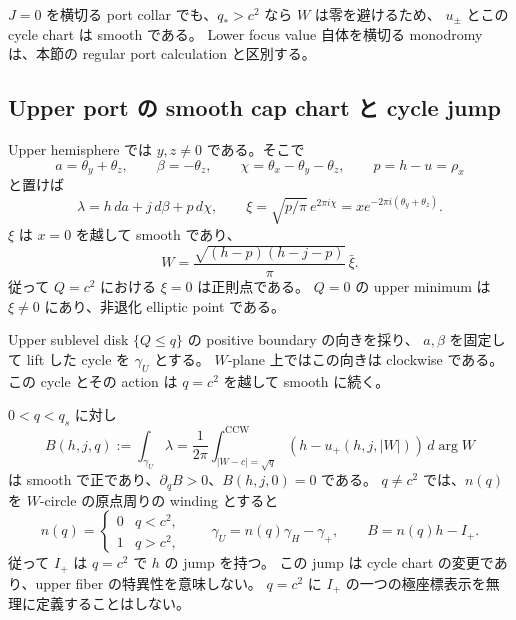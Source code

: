 $J=0$ を横切る port collar でも、$q_*>c^2$ なら $W$ は零を避けるため、
$u_\pm$ とこの cycle chart は smooth である。
Lower focus value 自体を横切る monodromy は、本節の regular port calculation と区別する。

\subsection{Upper port の smooth cap chart と cycle jump}

Upper hemisphere では $y,z\ne0$ である。そこで
\[
 a=\theta_y+\theta_z,\qquad \beta=-\theta_z,\qquad
 \chi=\theta_x-\theta_y-\theta_z,\qquad p=h-u=\rho_x
\]
と置けば
\begin{equation}\label{pa:upper-chart}
 \lambda=h\,da+j\,d\beta+p\,d\chi,
 \qquad \xi=\sqrt{p/\pi}\,e^{2\pi i\chi}
        =x e^{-2\pi i(\theta_y+\theta_z)}.
\end{equation}
$\xi$ は $x=0$ を越して smooth であり、
\[
 W=\frac{\sqrt{(h-p)(h-j-p)}}{\pi}\,\bar\xi.
\]
従って $Q=c^2$ における $\xi=0$ は正則点である。
$Q=0$ の upper minimum は $\xi\ne0$ にあり、非退化 elliptic point である。

Upper sublevel disk $\{Q\le q\}$ の positive boundary の向きを採り、
$a,\beta$ を固定して lift した cycle を $\gamma_U$ とする。
$W$-plane 上ではこの向きは clockwise である。
この cycle とその action は $q=c^2$ を越して smooth に続く。

\begin{proposition}\label{pa:upper-action}
$0<q<q_s$ に対し
\begin{equation}\label{pa:B}
 B(h,j,q):=\int_{\gamma_U}\lambda
 =\frac1{2\pi}\int_{|W-c|=\sqrt q}^{\mathrm{CCW}}
          (h-u_+(h,j,|W|))\,d\arg W
\end{equation}
は smooth で正であり、$\partial_q B>0$、$B(h,j,0)=0$ である。
$q\ne c^2$ では、$n(q)$ を $W$-circle の原点周りの winding とすると
\begin{equation}\label{pa:transition}
 n(q)=\begin{cases}0&q<c^2,\\1&q>c^2,\end{cases}
 \qquad
 \gamma_U=n(q)\gamma_H-\gamma_+,
 \qquad B=n(q)h-I_+.
\end{equation}
従って $I_+$ は $q=c^2$ で $h$ の jump を持つ。
この jump は cycle chart の変更であり、upper fiber の特異性を意味しない。
$q=c^2$ に $I_+$ の一つの極座標表示を無理に定義することはしない。
\end{proposition}

